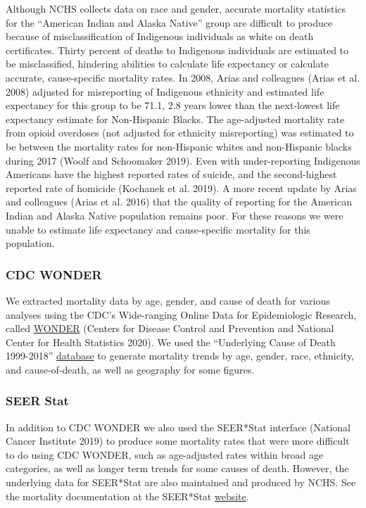 \documentclass[
  11pt,
]{article}
\begin{document}
Although NCHS collects data on race and gender, accurate mortality
statistics for the ``American Indian and Alaska Native'' group are
difficult to produce because of misclassification of Indigenous
individuals as white on death certificates. Thirty percent of deaths to
Indigenous individuals are estimated to be misclassified, hindering
abilities to calculate life expectancy or calculate accurate,
cause-specific mortality rates. In 2008, Arias and colleagues (Arias et
al. 2008) adjusted for misreporting of Indigenous ethnicity and
estimated life expectancy for this group to be 71.1, 2.8 years lower
than the next-lowest life expectancy estimate for Non-Hispanic Blacks.
The age-adjusted mortality rate from opioid overdoses (not adjusted for
ethnicity misreporting) was estimated to be between the mortality rates
for non-Hispanic whites and non-Hispanic blacks during 2017 (Woolf and
Schoomaker 2019). Even with under-reporting Indigenous Americans have
the highest reported rates of suicide, and the second-highest reported
rate of homicide (Kochanek et al. 2019). A more recent update by Arias
and colleagues (Arias et al. 2016) that the quality of reporting for the
American Indian and Alaska Native population remains poor. For these
reasons we were unable to estimate life expectancy and cause-specific
mortality for this population.

\hypertarget{cdc-wonder}{%
\subsubsection{\textbar{} CDC WONDER}\label{cdc-wonder}}

We extracted mortality data by age, gender, and cause of death for
various analyses using the CDC's Wide-ranging Online Data for
Epidemiologic Research, called \href{https://wonder.cdc.gov/}{WONDER}
(Centers for Disease Control and Prevention and National Center for
Health Statistics 2020). We used the ``Underlying Cause of Death
1999-2018''
\href{https://wonder.cdc.gov/wonder/help/ucd.html\#}{database} to
generate mortality trends by age, gender, race, ethnicity, and
cause-of-death, as well as geography for some figures.

\hypertarget{seer-stat}{%
\subsubsection{\textbar{} SEER Stat}\label{seer-stat}}

In addition to CDC WONDER we also used the SEER*Stat interface (National
Cancer Institute 2019) to produce some mortality rates that were more
difficult to do using CDC WONDER, such as age-adjusted rates within
broad age categories, as well as longer term trends for some causes of
death. However, the underlying data for SEER*Stat are also maintained
and produced by NCHS. See the mortality documentation at the SEER*Stat
\href{https://seer.cancer.gov/mortality/}{website}.
\end{document}
